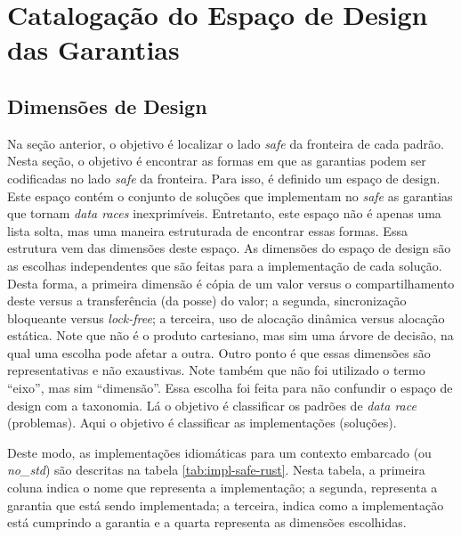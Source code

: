 \section{Catalogação do Espaço de Design das Garantias}
\label{sec:cost}

\subsection{Dimensões de Design}
\label{subsec:impl-safe}

Na seção anterior, o objetivo é localizar o lado \textit{safe} da fronteira de cada padrão. Nesta seção, o objetivo é encontrar as formas em que as garantias podem ser codificadas no lado \textit{safe} da fronteira. Para isso, é definido um espaço de design. Este espaço contém o conjunto de soluções que implementam no \textit{safe} as garantias que tornam \textit{data races} inexprimíveis. Entretanto, este espaço não é apenas uma lista solta, mas uma maneira estruturada de encontrar essas formas. Essa estrutura vem das dimensões deste espaço. As dimensões do espaço de design são as escolhas independentes que são feitas para a implementação de cada solução. Desta forma, a primeira dimensão é cópia de um valor versus o compartilhamento deste versus a transferência (da posse) do valor; a segunda, sincronização bloqueante versus \textit{lock-free}; a terceira, uso de alocação dinâmica versus alocação estática. Note que não é o produto cartesiano, mas sim uma árvore de decisão, na qual uma escolha pode afetar a outra. Outro ponto é que essas dimensões são representativas e não exaustivas. Note também que não foi utilizado o termo ``eixo'', mas sim ``dimensão''. Essa escolha foi feita para não confundir o espaço de design com a taxonomia. Lá o objetivo é classificar os padrões de \textit{data race} (problemas). Aqui o objetivo é classificar as implementações (soluções).

Deste modo, as implementações idiomáticas para um contexto embarcado (ou \textit{no\_std}) são descritas na tabela \ref{tab:impl-safe-rust}. Nesta tabela, a primeira coluna indica o nome que representa a implementação; a segunda, representa a garantia que está sendo implementada; a terceira, indica como a implementação está cumprindo a garantia e a quarta representa as dimensões escolhidas.

